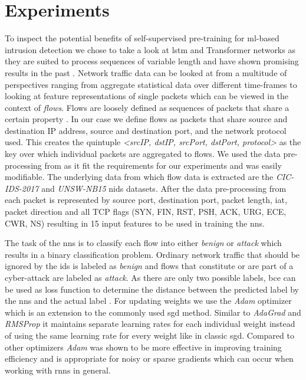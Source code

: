 \chapter{Experiments}\label{sec:experiments}

To inspect the potential benefits of self-supervised pre-training for \gls{ml}-based intrusion detection we chose to take a look at \gls{lstm} and Transformer networks as they are suited to process sequences of variable length and have shown promising results in the past . Network traffic data can be looked at from a multitude of perspectives ranging from aggregate statistical data over different time-frames \cite{kitsune} to looking at feature representations of single packets which can be viewed in the context of \textit{flows}. Flows are loosely defined as sequences of packets that share a certain property \cite{adversarial_recurrent_ids}. In our case we define flows as packets that share source and destination IP address, source and destination port, and the network protocol used. This creates the quintuple \textit{<srcIP, dstIP, srcPort, dstPort, protocol>} as the key over which individual packets are aggregated to flows. We used the data pre-processing from \cite{adversarial_recurrent_ids} as it fit the requirements for our experiments and was easily modifiable. The underlying data from which flow data is extracted are the \textit{CIC-IDS-2017} \cite{cic_ids_2017} and \textit{UNSW-NB15} \cite{unsw_nb15} \gls{nids} datasets. After the data pre-processing from \cite{adversarial_recurrent_ids} each packet is represented by source port, destination port, packet length, \gls{iat}, packet direction and all TCP flags (SYN, FIN, RST, PSH, ACK, URG, ECE, CWR, NS) resulting in 15 input features to be used in training the \glspl{nn}. \par

The task of the \glspl{nn} is to classify each flow into either \textit{benign} or \textit{attack} which results in a binary classification problem. Ordinary network traffic that should be ignored by the \gls{ids} is labeled as \textit{benign} and flows that constitute or are part of a cyber-attack are labeled as \textit{attack}. As there are only two possible labels, \gls{bce} can be used as loss function to determine the distance between the predicted label by the \glspl{nn} and the actual label . For updating weights we use the \textit{Adam} optimizer \cite{adam} which is an extension to the commonly used \gls{sgd} method. Similar to \textit{AdaGrad} \cite{optimizer_comparison} and \textit{RMSProp} \cite{optimizer_comparison} it maintains separate learning rates for each individual weight instead of using the same learning rate for every weight like in classic \gls{sgd}. Compared to other optimizers \textit{Adam} was shown to be more effective in improving training efficiency \cite{adam} and is appropriate for noisy or sparse gradients which can occur when working with \glspl{rnn} in general.

